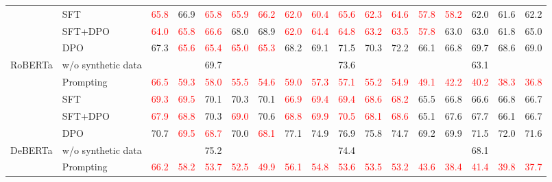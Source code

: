 \begin{table}[t]
\begin{tabular}{llccccccccccccccc}
 & SFT & \textcolor{red}{65.8} & 66.9 & \textcolor{red}{65.8} & \textcolor{red}{65.9} & \textcolor{red}{66.2} & \textcolor{red}{62.0} & \textcolor{red}{60.4} & \textcolor{red}{65.6} & \textcolor{red}{62.3} & \textcolor{red}{64.6} & \textcolor{red}{57.8} & \textcolor{red}{58.2} & 62.0 & 61.6 & 62.2 \\
 & SFT+DPO & \textcolor{red}{64.0} & \textcolor{red}{65.8} & \textcolor{red}{66.6} & 68.0 & 68.9 & \textcolor{red}{62.0} & \textcolor{red}{64.4} & \textcolor{red}{64.8} & \textcolor{red}{63.2} & \textcolor{red}{63.5} & \textcolor{red}{57.8} & 63.0 & 63.0 & 61.8 & 65.0 \\
 & DPO & 67.3 & \textcolor{red}{65.6} & \textcolor{red}{65.4} & \textcolor{red}{65.0} & \textcolor{red}{65.3} & 68.2 & 69.1 & 71.5 & 70.3 & 72.2 & 66.1 & 66.8 & 69.7 & 68.6 & 69.0 \\
\midrule
\multirow{5}{*}{RoBERTa} & w/o synthetic data & \multicolumn{5}{c}{69.7} & \multicolumn{5}{c}{73.6} & \multicolumn{5}{c}{63.1} \\
 & Prompting & \textcolor{red}{66.5} & \textcolor{red}{59.3} & \textcolor{red}{58.0} & \textcolor{red}{55.5} & \textcolor{red}{54.6} & \textcolor{red}{59.0} & \textcolor{red}{57.3} & \textcolor{red}{57.1} & \textcolor{red}{55.2} & \textcolor{red}{54.9} & \textcolor{red}{49.1} & \textcolor{red}{42.2} & \textcolor{red}{40.2} & \textcolor{red}{38.3} & \textcolor{red}{36.8} \\
 & SFT & \textcolor{red}{69.3} & \textcolor{red}{69.5} & 70.1 & 70.3 & 70.1 & \textcolor{red}{66.9} & \textcolor{red}{69.4} & \textcolor{red}{69.4} & \textcolor{red}{68.6} & \textcolor{red}{68.2} & 65.5 & 66.8 & 66.6 & 66.8 & 66.7 \\
 & SFT+DPO & \textcolor{red}{67.9} & \textcolor{red}{68.8} & 70.3 & \textcolor{red}{69.0} & 70.6 & \textcolor{red}{68.8} & \textcolor{red}{69.9} & \textcolor{red}{70.5} & \textcolor{red}{68.1} & \textcolor{red}{68.6} & 65.1 & 67.6 & 67.7 & 66.1 & 66.7 \\
 & DPO & 70.7 & \textcolor{red}{69.5} & \textcolor{red}{68.7} & 70.0 & \textcolor{red}{68.1} & 77.1 & 74.9 & 76.9 & 75.8 & 74.7 & 69.2 & 69.9 & 71.5 & 72.0 & 71.6 \\
\midrule
\multirow{5}{*}{DeBERTa} & w/o synthetic data & \multicolumn{5}{c}{75.2} & \multicolumn{5}{c}{74.4} & \multicolumn{5}{c}{68.1} \\
 & Prompting & \textcolor{red}{66.2} & \textcolor{red}{58.2} & \textcolor{red}{53.7} & \textcolor{red}{52.5} & \textcolor{red}{49.9} & \textcolor{red}{56.1} & \textcolor{red}{54.8} & \textcolor{red}{53.6} & \textcolor{red}{53.5} & \textcolor{red}{53.2} & \textcolor{red}{43.6} & \textcolor{red}{38.4} & \textcolor{red}{41.4} & \textcolor{red}{39.8} & \textcolor{red}{37.7} \\

\end{tabular}
\end{table}

